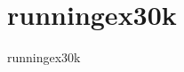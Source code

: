 \section{runningex30k}
\label{sec:dataSets:runningex30k}
\begin{dataSetDescription}{runningex30k}
\end{dataSetDescription}

